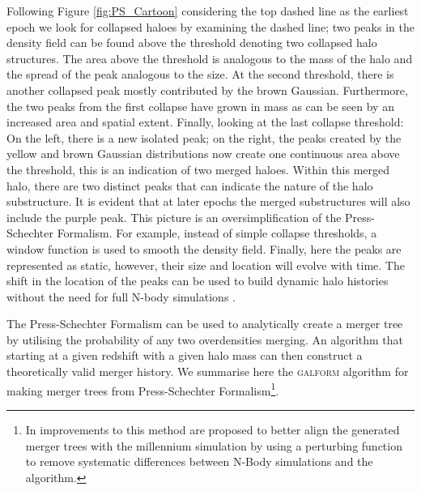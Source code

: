 Following Figure \ref{fig:PS_Cartoon} considering the top dashed line as the earliest epoch we look for collapsed haloes by examining the dashed line; two peaks in the density field can be found above the threshold denoting two collapsed halo structures. The area above the threshold is analogous to the mass of the halo and the spread of the peak analogous to the size. At the second threshold, there is another collapsed peak mostly contributed by the brown Gaussian. Furthermore, the two peaks from the first collapse have grown in mass as can be seen by an increased area and spatial extent. Finally, looking at the last collapse threshold: On the left, there is a new isolated peak; on the right, the peaks created by the yellow and brown Gaussian distributions now create one continuous area above the threshold, this is an indication of two merged haloes. Within this merged halo, there are two distinct peaks that can indicate the nature of the halo substructure. It is evident that at later epochs the merged substructures will also include the purple peak. This picture is an oversimplification of the Press-Schechter Formalism. For example, instead of simple collapse thresholds, a window function is used to smooth the density field. Finally, here the peaks are represented as static, however, their size and location will evolve with time. The shift in the location of the peaks can be used to build dynamic halo histories without the need for full N-body simulations \cite{Voivodic2019ExcursionCatalogues}.

The Press-Schechter Formalism can be used to analytically create a merger tree by utilising the probability of any two overdensities merging. An algorithm that starting at a given redshift with a given halo mass can then construct a theoretically valid merger history. We summarise here the \textsc{galform} \citep{Cole2000} algorithm for making merger trees from Press-Schechter Formalism\footnote{In \citet{Parkinson2008GeneratingTrees} improvements to this method are proposed to better align the generated merger trees with the millennium simulation by using a perturbing function to remove systematic differences between N-Body simulations and the algorithm.}.

